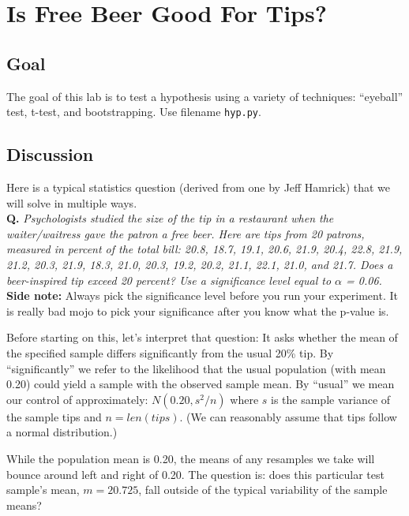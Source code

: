 \chapter{Is Free Beer Good For Tips?}

\setcounter{problem}{1}
\section{Goal}

\begin{fullwidth}

The goal of this lab is to test a hypothesis using a variety of techniques: ``eyeball'' test, t-test, and bootstrapping. Use filename {\tt hyp.py}. 

\section{Discussion}

Here is a typical statistics question (derived from one by Jeff Hamrick) that we will solve in multiple ways.\\

{\bf Q.} {\em Psychologists studied the size of the tip in a restaurant when the waiter/waitress gave the patron a free beer. Here are tips from 20 patrons, measured in percent of the total bill: 20.8, 18.7, 19.1, 20.6, 21.9, 20.4, 22.8,
        21.9, 21.2, 20.3, 21.9, 18.3, 21.0, 20.3,
        19.2, 20.2, 21.1, 22.1, 21.0, and 21.7. Does a beer-inspired tip exceed 20 percent? Use a significance level equal to $\alpha$ = 0.06.}\\
        
{\bf Side note:} Always pick the significance level before you run your experiment. It is really bad mojo to pick your significance after you know what the p-value is.

Before starting on this, let's interpret that question: It asks whether the mean of the specified sample differs significantly from the usual 20\% tip. By ``significantly'' we refer to the likelihood that the usual population (with mean 0.20) could yield a sample with the observed sample mean. By ``usual'' we mean our control of approximately: $N(0.20, s^2/n)$ where $s$ is the sample variance of the sample tips and $n=len(tips)$. (We can reasonably assume  that tips follow a normal distribution.)

While the population mean is 0.20, the means of any resamples we take will bounce around left and right of 0.20.  The question is: does this particular test sample's mean, $m=20.725$, fall outside of the typical variability of the sample means?


\end{fullwidth}
